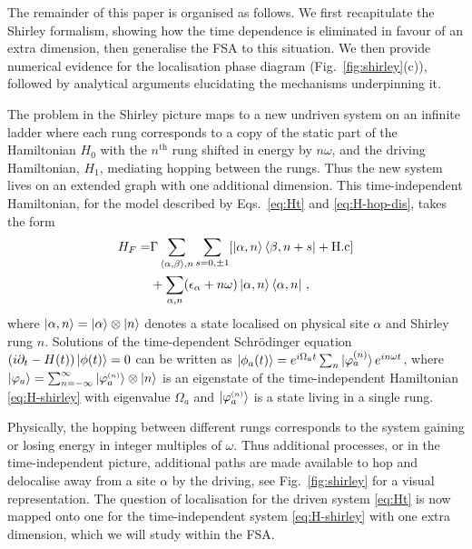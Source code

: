 \documentclass[aps,prl,twocolumn,superscriptaddress,nobalancelastpage,longbibliography]{revtex4-2}
\begin{document}
The remainder of this paper is organised as follows. We first recapitulate the Shirley formalism, showing how the time dependence is eliminated in favour of an extra dimension, then generalise the FSA to this situation. We then provide numerical evidence for the localisation phase diagram (Fig.~\ref{fig:shirley}(c)), followed by analytical arguments elucidating the mechanisms underpinning it. 

The problem in the Shirley picture maps to a new undriven system on an infinite ladder where each rung corresponds to a copy of the static part of the Hamiltonian $H_0$ with the $n^\mathrm{th}$ rung shifted in energy by $n\omega$, and the driving Hamiltonian, $H_1$, mediating hopping between the rungs. Thus the new system lives on an extended graph with one additional dimension.
This time-independent Hamiltonian, for the model described by Eqs.~\ref{eq:Ht} and \ref{eq:H-hop-dis}, takes the form
\begin{equation}
\begin{split}
    H_F = &\Gamma\sum_{\braket{\alpha,\beta},n}\sum_{s=0,\pm 1}[\ket{\alpha,n}\bra{\beta,n+s}+\mathrm{H.c}]\\&+\sum_{\alpha,n}(\epsilon_\alpha+n\omega)\ket{\alpha,n}\bra{\alpha,n}\,,
    \label{eq:H-shirley}
\end{split}
\end{equation}
where $\ket{\alpha,n}=\ket{\alpha}\otimes\ket{n}$ denotes a state localised on physical site $\alpha$ and Shirley rung $n$.
Solutions of the time-dependent Schr\"odinger equation $\left(i\partial_t-H(t)\right)\ket{\phi(t)}=0$ can be written 
as $\ket{\phi_a(t)}=e^{i\Omega_a t}\sum_{n}\ket{\varphi_a^{(n)}}e^{in\omega t}$, 
where 
$\ket{\varphi_a}=\sum_{n=-\infty}^\infty\ket{\varphi_a^{\scriptscriptstyle{(n)}}}\otimes\ket{n}$ 
is an eigenstate of the time-independent 
Hamiltonian \eqref{eq:H-shirley} with eigenvalue $\Omega_a$ and $\ket{\varphi_a^{\scriptscriptstyle{(n)}}}$ is a state living in a single rung. 

Physically, the hopping between different rungs corresponds to the system gaining or losing energy in integer multiples of $\omega$.
Thus additional processes, or in the time-independent picture, additional paths are made available to hop and delocalise away from a site $\alpha$ by the driving, see Fig.~\ref{fig:shirley} for a visual representation. 
The question of localisation for the driven system \eqref{eq:Ht} is now mapped onto one for the time-independent system \eqref{eq:H-shirley} with one extra dimension, which we will study within the FSA. 
\end{document}
